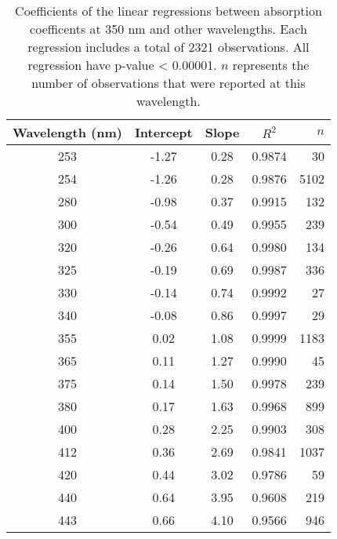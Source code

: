 \begin{table}[ht]
\centering
\begin{tabular}{ccccr}
  \hline
Wavelength (nm) & Intercept & Slope & $R^2$ & $n$ \\ 
  \hline
253 & -1.27 & 0.28 & 0.9874 & 30 \\ 
  254 & -1.26 & 0.28 & 0.9876 & 5102 \\ 
  280 & -0.98 & 0.37 & 0.9915 & 132 \\ 
  300 & -0.54 & 0.49 & 0.9955 & 239 \\ 
  320 & -0.26 & 0.64 & 0.9980 & 134 \\ 
  325 & -0.19 & 0.69 & 0.9987 & 336 \\ 
  330 & -0.14 & 0.74 & 0.9992 & 27 \\ 
  340 & -0.08 & 0.86 & 0.9997 & 29 \\ 
  355 & 0.02 & 1.08 & 0.9999 & 1183 \\ 
  365 & 0.11 & 1.27 & 0.9990 & 45 \\ 
  375 & 0.14 & 1.50 & 0.9978 & 239 \\ 
  380 & 0.17 & 1.63 & 0.9968 & 899 \\ 
  400 & 0.28 & 2.25 & 0.9903 & 308 \\ 
  412 & 0.36 & 2.69 & 0.9841 & 1037 \\ 
  420 & 0.44 & 3.02 & 0.9786 & 59 \\ 
  440 & 0.64 & 3.95 & 0.9608 & 219 \\ 
  443 & 0.66 & 4.10 & 0.9566 & 946 \\ 
   \hline
\end{tabular}
\caption{Coefficients of the linear regressions between absorption 
coefficents at 350 nm and other wavelengths. Each regression includes a total 
of 2321 observations. All regression have p-value < 0.00001.  $n$ represents 
the number of observations that were reported at this wavelength.} 
\end{table}
